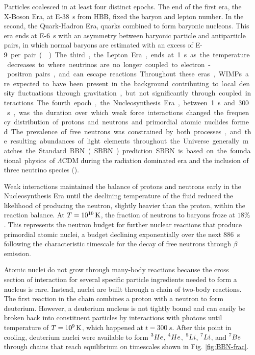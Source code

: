 \documentclass{paper}
\begin{document}
  Particles coalesced in at least four distinct epochs. The end of the first 
  era, the X-Boson Era, at \SI{E-38}{s} from HBB, fixed the baryon and lepton 
  number.  In the second, the Quark-Hadron Era, quarks combined to form 
  baryonic nucleons. This era ends at \SI{E-6}{s} with an asymmetry between 
  baryonic particle and antiparticle pairs, in which normal baryons are 
  estimated with an excess of \SI{E-9} per pair (\cite{1993PhRvL..70.2833F}). 
  The third, the Lepton Era, ends at \SI{1}{s} as the temperature decreases to 
  where neutrinos are no longer coupled to electron-positron pairs, and can 
  escape reactions. Throughout these eras, WIMPs are expected to have been 
  present in the background contributing to local density fluctuations 
  through gravitation, but not significantly through coupled interactions.

  The fourth epoch, the Nucleosynthesis Era, between \SI{1}{s} and 
  \SI{300}{s}, was the duration over which weak force interactions changed
  the frequency distribution of protons and neutrons and primordial atomic 
  nuclides formed. The prevalence of free neutrons was constrained by both
  processes, and the resulting abundances of light elements throughout the 
  Universe generally matches the Standard BBN (SBBN) prediction. SBBN is based 
  on the foundational physics of $\Lambda$CDM during the radiation dominated 
  era and the inclusion of three neutrino species (\cite{Cyburt_2016}). 

  Weak interactions maintained the balance of protons and neutrons early in
  the Nucleosynthesis Era until the declining temperature of the fluid reduced 
  the likelihood of producing the neutron, slightly heavier than the proton, 
  within the reaction balance. At \(T = \SI{E10}{K}\), the fraction of 
  neutrons to baryons froze at \(18\%\). This represents the neutron budget 
  for further nuclear reactions that produce primordial atomic nuclei, a 
  budget declining exponentially over the next \SI{886}{s} following the 
  characteristic timescale for the decay of free neutrons through \(\beta\)
  emission.

  Atomic nuclei do not grow through many-body reactions because the cross 
  section of interaction for several specific particle ingredients needed to 
  form a nucleus is rare. Instead, nuclei are built through a chain of 
  two-body reactions. The first reaction in the chain combines a proton with a 
  neutron to form deuterium. However, a deuterium nucleus is not tightly bound 
  and can easily be broken back into constituent particles by interactions 
  with photons until temperature of \(T = \SI{E9}{K}\), which happened at 
  \(t = \SI{300}{s}\). After this point in cooling, deuterium nuclei were 
  available to form \(\prescript{3}{}{He}\), \(\prescript{4}{}{He}\), 
  \(\prescript{6}{}{Li}\), \(\prescript{7}{}{Li}\), and 
  \(\prescript{7}{}{Be}\) through chains that reach equilibrium on timescales 
  shown in Fig. \ref{fig:BBN-frac}.
\end{document}
